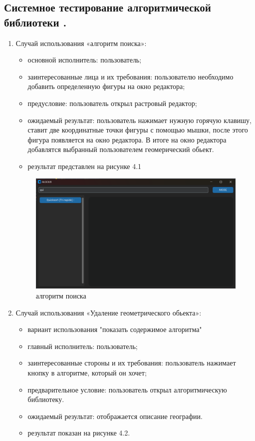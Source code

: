 \subsection{Системное тестирование алгоритмической библиотеки .}
\begin{enumerate}
	
	\item Случай использования «алгоритм поиска»:
	\begin{itemize}
		\item основной исполнитель: пользователь;
		\item заинтересованные лица и их требования: пользователю необходимо добавить определенную фигуры на окно редактора;
		\item предусловие: пользователь открыл растровый редактор;
		\item ожидаемый результат: пользователь нажимает нужную горячую клавишу, ставит две координатные точки фигуры с помощью мышки, после этого фигура появляется на окно редактора. В итоге на окно редактора добавлятся выбранный пользователем геомерический обьект.
		\item результат представлен на рисунке 4.1
	\end{itemize}
	
	

	\begin{figure}[H]
		\centering
		\includegraphics[width=0.7\linewidth]{images/adding}
		\caption{алгоритм поиска}
		\label{fig:classdiag}
	\end{figure}
	
	\item Случай использования «Удаление геометрического обьекта»:
	\begin{itemize}
		\item вариант использования "показать содержимое алгоритма"
		\item главный исполнитель: пользователь;
		\item заинтересованные стороны и их требования: пользователь нажимает кнопку в алгоритме, который он хочет;
		\item предварительное условие: пользователь открыл алгоритмическую библиотеку.
		\item ожидаемый результат: отображается описание географии.
			\item результат показан на рисунке 4.2.
	\end{itemize}
	

\end{enumerate}

